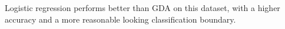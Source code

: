 \begin{answer}
    Logistic regression performs better than GDA on this dataset, with a higher accuracy and a more reasonable looking classification boundary.
    
\end{answer}
